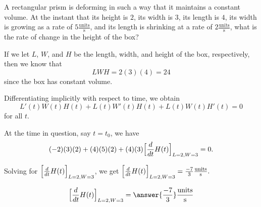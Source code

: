 \documentclass{ximera}
\author{Steven Gubkin}
\begin{document}
\begin{exercise}

A rectangular prism is deforming in such a way that it maintains a
constant volume.  At the instant that its height is $2$, its width is
$3$, its length is $4$, its width is growing as a rate of $5
\frac{\textrm{units}}{\textrm{s}}$, and its length is shrinking at a
rate of $2 \frac{\textrm{units}}{\textrm{s}}$, what is the rate of
change in the height of the box?

\begin{hint}
If we let $L$, $W$, and $H$ be the length, width, and height of the
box, respectively, then we know that
\[
LWH = 2(3)(4) = 24
\]
since the box has constant volume.
\end{hint}

\begin{hint}	
  Differentiating implicitly with respect to time, we obtain
\[
L'(t)W(t)H(t)+L(t)W'(t)H(t)+L(t)W(t)H'(t) = 0
\]
for all $t$.
\end{hint}

\begin{hint}
  At the time in question, say $t = t_0$, we have
\[
(-2)(3)(2)+(4)(5)(2)+(4)(3)\Bigl[\frac{d}{dt}H(t)\Bigr]_{L=2, W=3} = 0.
\]
\end{hint}

\begin{hint}	
  Solving for $\Bigl[\frac{d}{dt}H(t)\Bigr]_{L=2, W=3}$, we get $\Bigl[\frac{d}{dt}H(t)\Bigr]_{L=2, W=3} = \frac{-7}{3}\frac{\textrm{units}}{\textrm{s}}.$
\end{hint}

\begin{prompt}
  \[
\Bigl[\frac{d}{dt}H(t)\Bigr]_{L=2, W=3} = \answer{\frac{-7}{3}}\frac{\textrm{units}}{\textrm{s}}
  \]
\end{prompt}

\end{exercise}
\end{document}
